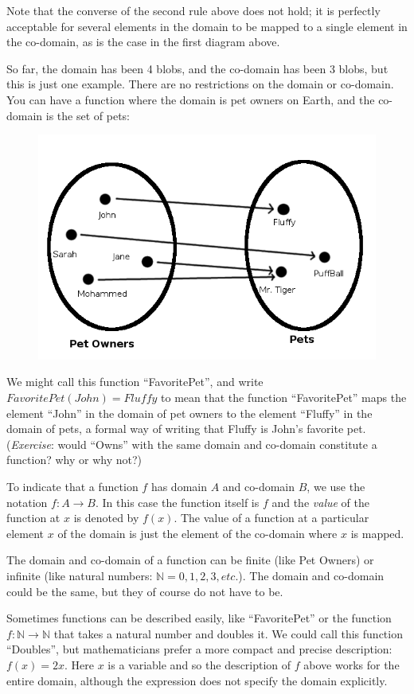 \documentclass[UTF8]{book}
\begin{document}
\begin{CJK}{UTF8}{gbsn}
Note that the converse of the second rule above does not hold; it is perfectly acceptable for several elements in the domain to be mapped to a single element in the co-domain, as is the case in the first diagram above.

So far, the domain has been 4 blobs, and the co-domain has been 3 blobs, but this is just one example. There are no restrictions on the domain or co-domain. You can have a function where the domain is pet owners on Earth, and the co-domain is the set of pets:

\begin{figure}[H]
\centering
\includegraphics[width=0.8\linewidth]{function_pets}
\end{figure}

We might call this function ``FavoritePet'', and write $FavoritePet(John) = Fluffy$ to mean that the function ``FavoritePet'' maps the element ``John'' in the domain of pet owners to the element ``Fluffy'' in the domain of pets, a formal way of writing that Fluffy is John's favorite pet. (\emph{Exercise}: would ``Owns'' with the same domain and co-domain constitute a function? why or why not?)

To indicate that a function $f$ has domain $A$ and co-domain $B$, we use the notation $f: A \rightarrow B$. In this case the function itself is $f$ and the \emph{value} of the function at $x$ is denoted by $f(x)$. The value of a function at a particular element $x$ of the domain is just the element of the co-domain where $x$ is mapped.

The domain and co-domain of a function can be finite (like Pet Owners) or infinite (like natural numbers: $\mathbb{N} = {0, 1, 2, 3, etc.}$). The domain and co-domain could be the same, but they of course do not have to be.

Sometimes functions can be described easily, like ``FavoritePet'' or the function $f: \mathbb{N} \rightarrow \mathbb{N}$ that takes a natural number and doubles it. We could call this function ``Doubles'', but mathematicians prefer a more compact and precise description: $f(x) = 2x$. Here $x$ is a variable and so the description of $f$ above works for the entire domain, although the expression does not specify the domain explicitly.


\end{CJK}
\end{document}
